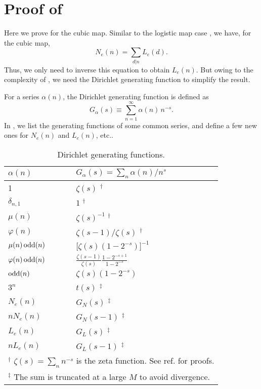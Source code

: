 \documentclass[twocolumn]{revtex4-1}
\begin{document}
\section{\label{apd:cublyndon}Proof of }

Here we prove  for the cubic map.
%
Similar to the logistic map case ,
  we have, for the cubic map,
\[
  N_e(n) = \sum_{d|n} L_e(d).
\]
Thus, we only need to inverse this equation to obtain $L_e(n)$.
But owing to the complexity of ,
  we need the Dirichlet generating function
  to simplify the result.

For a series $\alpha(n)$,
the Dirichlet generating function is defined as
\[
    G_\alpha(s) \equiv \sum_{n=1}^\infty \alpha(n) \, n^{-s}.
\]
In , we list the generating functions of
some common series,
and define a few new ones for $N_e(n)$ and $L_e(n)$, etc..





\begin{table}[h]\footnotesize
  \caption{Dirichlet generating functions.}
\begin{center}
\begin{tabular}{ll}
\hline
$\alpha(n)$   &   $G_\alpha(s) = \sum_{n} \alpha(n)/n^{s}$
\\
\hline
1
\qquad \qquad \qquad \qquad \qquad \qquad \qquad
  & $\zeta(s)$ $^\dagger$
\\
$\delta_{n,1}$         & $1$ $^\dagger$
\\
$\mu(n)$    & $\zeta(s)^{-1}$ $^\dagger$
\\
$\varphi(n)$   & $\zeta(s-1)/\zeta(s)$ $^\dagger$
\\
$\mu(n) \, \mathrm{odd}(n)$
  & $\Big[ \zeta(s) (1-2^{-s}) \Big]^{-1}$
\\
$\varphi(n) \, \mathrm{odd}(n)$
  & $\frac{\zeta(s-1)}{\zeta(s)} \frac{1-2^{-s+1}}{1-2^{-s}}$
\\
$\mathrm{odd}(n)$   & $\zeta(s) (1-2^{-s})$
\\
{$3^n$}       & $t(s)$ $^\ddagger$
\\
{$N_e(n)$}      & $G_N(s)$ $^\ddagger$
\\
{$n N_e(n)$}  & $G_N(s-1)$ $^\ddagger$
\\
$L_e(n)$    & $G_L(s)$ $^\ddagger$
\\
$nL_e(n)$   & $G_L(s-1)$ $^\ddagger$
\\
\hline
\multicolumn{2}{p{\linewidth}}{
$^\dagger$
$\zeta(s) = \sum_n n^{-s}$ is the zeta function.
See ref. \cite{hardy} for proofs.
}\\
\multicolumn{2}{p{\linewidth}}{
$^\ddagger$
The sum is truncated at a large $M$ to avoid divergence.
}\\
\hline
\end{tabular}
\end{center}
\label{tab:genfunc}
\end{table}
\end{document}
